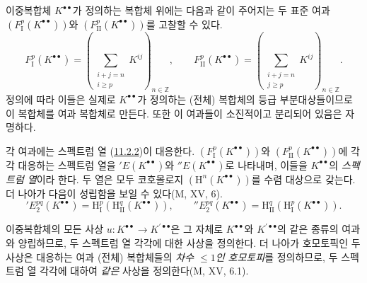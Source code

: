 \begin{env}[11.3.2]
\label{0.11.3.2-fr}
이중복합체 $K^{\bullet\bullet}$가 정의하는 복합체 위에는 다음과 같이
주어지는 두 표준 여과 $(F_{\mathrm I}^p(K^{\bullet\bullet}))$와
$(F_{\mathrm{II}}^p(K^{\bullet\bullet}))$를 고찰할 수 있다.
\[
\label{0.11.3.2.1-fr}
  F_{\mathrm I}^p(K^{\bullet\bullet})
  =\left(\sum_{\substack{i+j=n\\i\geq p}}K^{ij}\right)_{n\in\mathbb Z},
  \qquad
  F_{\mathrm{II}}^p(K^{\bullet\bullet})
  =\left(\sum_{\substack{i+j=n\\j\geq p}}K^{ij}\right)_{n\in\mathbb Z}.
  \tag{11.3.2.1}
\]
정의에 따라 이들은 실제로 $K^{\bullet\bullet}$가 정의하는 (전체)
복합체의 등급 부분대상들이므로 이 복합체를 여과 복합체로 만든다. 또한 이
여과들이 소진적이고 분리되어 있음은 자명하다.

각 여과에는 스펙트럼 열
(\hyperref[0.11.2.2-fr]{11.2.2})이 대응한다.
$(F_{\mathrm I}^p(K^{\bullet\bullet}))$와
$(F_{\mathrm{II}}^p(K^{\bullet\bullet}))$에 각각 대응하는 스펙트럼 열을
$'E(K^{\bullet\bullet})$와 $''E(K^{\bullet\bullet})$로 나타내며, 이들을
$K^{\bullet\bullet}$의 \emph{스펙트럼 열}이라 한다. 두 열은 모두
코호몰로지 $(\mathrm H^n(K^{\bullet\bullet}))$를 수렴 대상으로 갖는다.
더 나아가 다음이 성립함을 보일 수 있다(M, XV, 6).
\[
\label{0.11.3.2.2-fr}
  'E_2^{pq}(K^{\bullet\bullet})
  =\mathrm H_{\mathrm I}^p(\mathrm H_{\mathrm{II}}^q(K^{\bullet\bullet})),
  \qquad
  ''E_2^{pq}(K^{\bullet\bullet})
  =\mathrm H_{\mathrm{II}}^q(\mathrm H_{\mathrm I}^p(K^{\bullet\bullet})).
  \tag{11.3.2.2}
\]

이중복합체의 모든 사상
$u:K^{\bullet\bullet}\to K^{\prime\bullet\bullet}$은 그 자체로
$K^{\bullet\bullet}$와 $K^{\prime\bullet\bullet}$의 같은 종류의 여과와
양립하므로, 두 스펙트럼 열 각각에 대한 사상을 정의한다. 더 나아가 호모토픽인
두 사상은 대응하는 여과 (전체) 복합체들의 \emph{차수 $\leq1$인
호모토피}를 정의하므로, 두 스펙트럼 열 각각에 대하여 \emph{같은} 사상을
정의한다(M, XV, 6.1).
\end{env}


